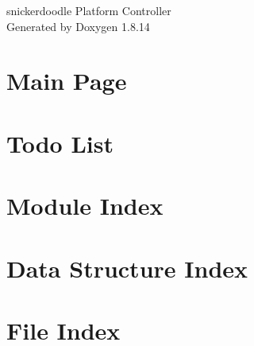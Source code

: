 \documentclass[twoside]{book}
\newcommand{\+}{\discretionary{\mbox{\scriptsize$\hookleftarrow$}}{}{}}
\newcommand{\clearemptydoublepage}{%
  \newpage{\pagestyle{empty}\cleardoublepage}%
}
\begin{document}
\hypersetup{pageanchor=false,
             bookmarksnumbered=true,
             pdfencoding=unicode
            }
\begin{titlepage}
\vspace*{7cm}
\begin{center}%
{\Large snickerdoodle Platform Controller }\\
\vspace*{1cm}
{\large Generated by Doxygen 1.8.14}\\
\end{center}
\end{titlepage}
\clearemptydoublepage
{}
\tableofcontents
\clearemptydoublepage
{}
\hypersetup{pageanchor=true}

\chapter{Main Page}
\label{index}\hypertarget{index}{}
\chapter{Todo List}
\label{todo}

\chapter{Module Index}

\chapter{Data Structure Index}

\chapter{File Index}

\end{document}

